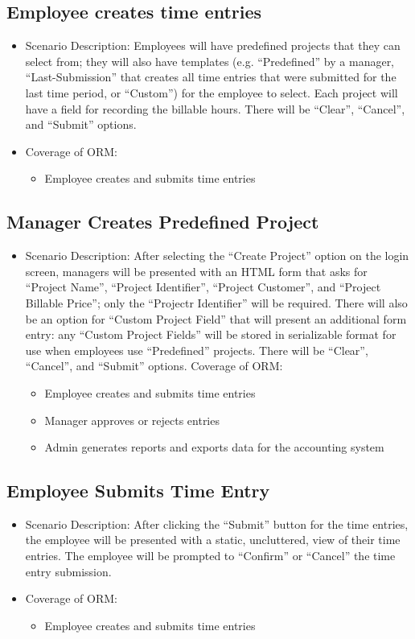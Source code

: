 \documentclass[12pt]{article}
\begin{document}
\subsection{ Employee creates time entries}
\begin{itemize}
\item Scenario Description: Employees will have predefined projects that they can select from; they will also have templates (e.g. “Predefined” by a manager, “Last-Submission” that creates all time entries that were submitted for the last time period, or “Custom”) for the employee to select. Each project will have a field for recording the billable hours. There will be “Clear”, “Cancel”, and “Submit” options.
\item Coverage of ORM:
\begin{itemize}
\item Employee creates and submits time entries
\end{itemize}
\end{itemize}

\subsection{ Manager Creates Predefined Project}
\begin{itemize}
\item Scenario Description: After selecting the “Create Project” option on the login screen, managers will be presented with an HTML form that asks for “Project Name”, “Project Identifier”, “Project Customer”, and “Project Billable Price”; only the “Projectr Identifier” will be required. There will also be an option for “Custom Project Field” that will present an additional form entry: any “Custom Project Fields” will be stored in serializable format for use when employees use “Predefined” projects. There will be “Clear”, “Cancel”, and “Submit” options.
Coverage of ORM:
\begin{itemize}
\item Employee creates and submits time entries
\item Manager approves or rejects entries
\item Admin generates reports and exports data for the accounting system
\end{itemize}
\end{itemize}

\subsection{ Employee Submits Time Entry}
\begin{itemize}
\item Scenario Description: After clicking the “Submit” button for the time entries, the employee will be presented with a static, uncluttered, view of their time entries. The employee will be prompted to “Confirm” or “Cancel” the time entry submission.
\item Coverage of ORM:
\begin{itemize}
\item Employee creates and submits time entries
\end{itemize}
\end{itemize}
\end{document}
